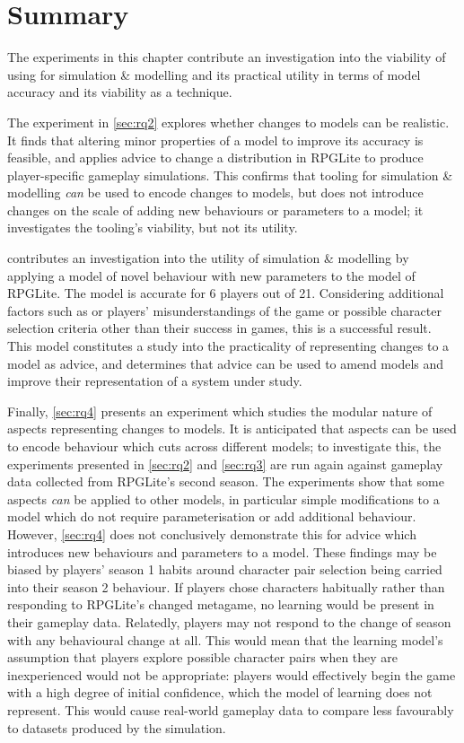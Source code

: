 \section{Summary}
\label{experiment_results_final_discussion}

The experiments in this chapter contribute an investigation into the
viability of using \aop for simulation \& modelling and its practical utility
in terms of model accuracy and its viability as a technique.

The experiment in \cref{sec:rq2} explores whether \aspectoriented{} changes to
models can be realistic. It finds that altering minor properties of a model to
improve its accuracy is feasible, and applies advice to change a distribution in
RPGLite to produce player-specific gameplay simulations. This confirms that
\aspectoriented{} tooling for simulation \& modelling \emph{can} be used to
encode changes to models, but does not introduce changes on the scale of adding
new behaviours or parameters to a model; it investigates the tooling's
viability, but not its utility.

 contributes an investigation into the utility of
\aspectoriented{} simulation \& modelling by applying a model of novel behaviour
with new parameters to the model of RPGLite. The model is accurate for 6 players
out of 21. Considering additional factors such as or players' misunderstandings
of the game or possible character selection criteria other than their success in
games, this is a successful result. This model constitutes a study into the
practicality of representing changes to a model as advice, and determines that
advice can be used to amend models and improve their representation of a system
under study.

Finally, \cref{sec:rq4} presents an experiment which studies the modular nature
of aspects representing changes to models. It is anticipated that aspects can be
used to encode behaviour which cuts across different models; to investigate
this, the experiments presented in \cref{sec:rq2} and \cref{sec:rq3} are run
again against gameplay data collected from RPGLite's second season. The
experiments show that some aspects \emph{can} be applied to other models, in
particular simple modifications to a model which do not require parameterisation
or add additional behaviour. However, \cref{sec:rq4} does not conclusively
demonstrate this for advice which introduces new behaviours and parameters to a
model. These findings may be biased by players' season 1 habits around character
pair selection being carried into their season 2 behaviour. If players chose
characters habitually rather than responding to RPGLite's changed metagame, no
learning would be present in their gameplay data. Relatedly, players may not
respond to the change of season with any behavioural change at all. This would
mean that the learning model's assumption that players explore possible
character pairs when they are inexperienced would not be appropriate: players
would effectively begin the game with a high degree of initial confidence, which
the model of learning does not represent. This would cause real-world gameplay
data to compare less favourably to datasets produced by the simulation.

